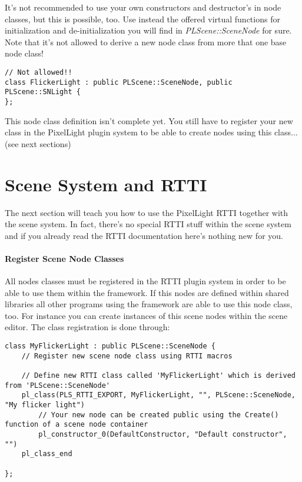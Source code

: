 It's not recommended to use your own constructors and destructor's in node classes, but this is possible, too. Use instead the offered virtual functions for initialization and de-initialization you will find in \emph{PLScene::SceneNode} for sure. Note that it's not allowed to derive a new node class from more that one base node class!

\begin{lstlisting}[caption=Invalid scene node class creating]
// Not allowed!!
class FlickerLight : public PLScene::SceneNode, public PLScene::SNLight {
};
\end{lstlisting}

This node class definition isn't complete yet. You still have to register your new class in the PixelLight plugin system to be able to create nodes using this class... (see next sections)




\section{Scene System and RTTI}
The next section will teach you how to use the PixelLight RTTI together with the scene system. In fact, there's no special RTTI stuff within the scene system and if you already read the RTTI documentation here's nothing new for you.


\paragraph{Register Scene Node Classes}
All nodes classes must be registered in the RTTI plugin system in order to be able to use them within the framework. If this nodes are defined within shared libraries all other programs using the framework are able to use this node class, too. For instance you can create instances of this scene nodes within the scene editor. The class registration is done through:

\begin{lstlisting}[caption=RTTI and own new scene node class]
class MyFlickerLight : public PLScene::SceneNode {
	// Register new scene node class using RTTI macros

	// Define new RTTI class called 'MyFlickerLight' which is derived from 'PLScene::SceneNode'
	pl_class(PLS_RTTI_EXPORT, MyFlickerLight, "", PLScene::SceneNode, "My flicker light")
		// Your new node can be created public using the Create() function of a scene node container
		pl_constructor_0(DefaultConstructor, "Default constructor", "")
	pl_class_end

};
\end{lstlisting}

